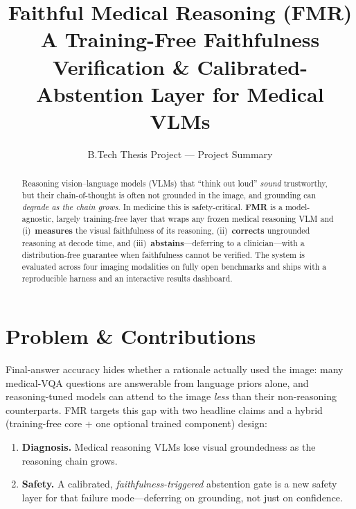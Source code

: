 \documentclass[11pt]{article}
\title{\textbf{Faithful Medical Reasoning (FMR)}\\[2pt]
\large A Training-Free Faithfulness Verification \& Calibrated-Abstention Layer for Medical VLMs}
\author{B.Tech Thesis Project --- Project Summary}
\date{}
\begin{document}
\maketitle
\vspace{-2.2em}

\begin{abstract}
\noindent Reasoning vision--language models (VLMs) that ``think out loud'' \emph{sound}
trustworthy, but their chain-of-thought is often not grounded in the image, and grounding
can \emph{degrade as the chain grows}. In medicine this is safety-critical. \textbf{FMR} is a
model-agnostic, largely training-free layer that wraps any frozen medical reasoning VLM and
(i)~\textbf{measures} the visual faithfulness of its reasoning, (ii)~\textbf{corrects}
ungrounded reasoning at decode time, and (iii)~\textbf{abstains}---deferring to a
clinician---with a distribution-free guarantee when faithfulness cannot be verified. The
system is evaluated across four imaging modalities on fully open benchmarks and ships with a
reproducible harness and an interactive results dashboard.
\end{abstract}

\section{Problem \& Contributions}
Final-answer accuracy hides whether a rationale actually used the image: many medical-VQA
questions are answerable from language priors alone, and reasoning-tuned models can attend to
the image \emph{less} than their non-reasoning counterparts. FMR targets this gap with two
headline claims and a hybrid (training-free core + one optional trained component) design:
\begin{enumerate}[leftmargin=1.4em,itemsep=1pt]
  \item \textbf{Diagnosis.} Medical reasoning VLMs lose visual groundedness as the reasoning
        chain grows.
  \item \textbf{Safety.} A calibrated, \emph{faithfulness-triggered} abstention gate is a new
        safety layer for that failure mode---deferring on grounding, not just on confidence.
\end{enumerate}
\end{document}
